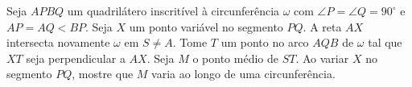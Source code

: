 Seja $APBQ$ um quadrilátero inscritível à circunferência $\omega$ com $\angle P = \angle Q = 90^\circ$ e $AP=AQ < BP$. Seja $X$ um ponto variável no segmento $PQ$. A reta $AX$ intersecta novamente $\omega$ em $S \ne A$. Tome $T$ um ponto no arco $AQB$ de $\omega$ tal que $XT$ seja perpendicular a $AX$. Seja $M$ o ponto médio de $ST$. Ao variar $X$ no segmento $PQ$, mostre que $M$ varia ao longo de uma circunferência.
